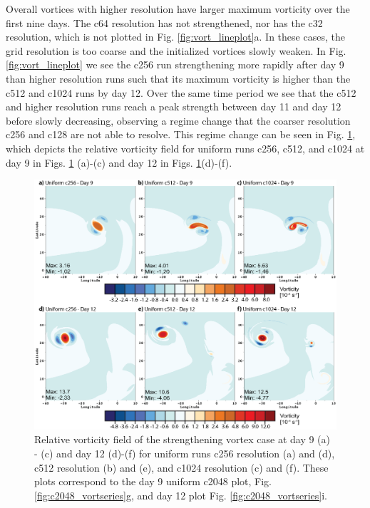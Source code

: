 Overall vortices with higher resolution have larger
maximum vorticity over the first nine days. The c64 resolution has not strengthened, nor has
the c32 resolution, which is not plotted in Fig. \ref{fig:vort_lineplot}a. 
In these cases, the grid resolution is
too coarse and the initialized vortices slowly weaken.
In Fig. \ref{fig:vort_lineplot} we see the c256 run strengthening 
more rapidly after day 9 than higher resolution runs such
that its maximum vorticity is higher than the c512 and c1024 runs by day 12.  Over the same time 
period we see that the c512 and higher resolution runs reach a peak strength between day 11 and day 12
before slowly decreasing, observing a regime change that the coarser resolution c256 and c128 are not
able to resolve. This regime change can be seen in Fig. \ref{fig:uni_d9nd12}, which 
depicts the relative vorticity field for uniform runs c256, c512, and c1024 at day 9 in
Figs. \ref{fig:uni_d9nd12} (a)-(c) and day 12 in Figs. \ref{fig:uni_d9nd12}(d)-(f).

\begin{figure}
   \centerline{%
   \noindent
   \includegraphics[width=\textwidth]{Chap2/uni_runs_day9n12-01}}
   \caption{Relative vorticity field of the 
   strengthening vortex case at day 9 (a) - (c) and day 12 (d)-(f) for uniform runs 
   c256 resolution (a) and (d), c512 resolution (b) and (e), and 
   c1024 resolution (c) and (f). These plots
   correspond to the day 9 uniform c2048 plot, Fig. \ref{fig:c2048_vortseries}g, and
   day 12 plot Fig. \ref{fig:c2048_vortseries}i.
   }
   \label{fig:uni_d9nd12}
\end{figure}


